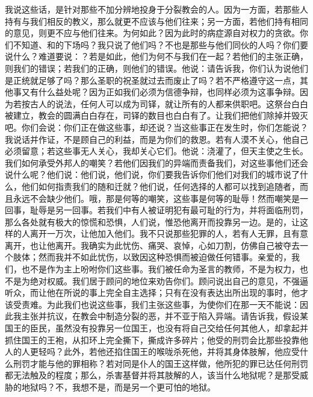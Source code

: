 我说这些话，是针对那些不加分辨地投身于分裂教会的人。因为一方面，若那些人持有与我们相反的教义，那么就更不应该与他们往来；另一方面，若他们持有相同的意见，则更不应与他们往来。为何如此？因为此时的病症源自对权力的贪欲。你们不知道、和的下场吗？我只说了他们吗？不也是那些与他们同伙的人吗？你们要说什么？难道要说：？若是如此，他们为何不与我们在一起？若他们的主张正确，则我们的错误；若我们的正确，则他们的错误。他说：请告诉我，你们认为说他们是正统就足够了吗？那么圣职的祝圣就过去而废止了吗？若不严格遵守这一点，其他事又有什么益处呢？因为正如我们必须为信德争辩，也同样必须为这事争辩。因为若按古人的说法，任何人可以成为司铎，就让所有的人都来供职吧。这祭台白白被建立，教会的圆满白白存在，司铎的数目也白白有了。让我们把他们除掉并毁灭吧。你们会说：你们正在做这些事，却还说？当这些事正在发生时，你们怎能说？我说话并作证，不是顾自己的利益，而是为你们的救恩。若有人漠不关心，他自己必须留意；若这些事无人关心，我却关心它们。他说：浇灌了，但天主使之生长。我们如何承受外邦人的嘲笑？若他们因我们的异端而责备我们，对这些事他们还会说什么呢？他们说：他们说，他们说，你们要我告诉你们他们对我们的城市说了什么，他们如何指责我们的随和迁就？他们说，任何选择的人都可以找到追随者，而且永远不会缺少他们。哦，那是何等的嘲笑，这些事是何等的耻辱！然而嘲笑是一回事，耻辱是另一回事。若我们中有人被证明犯有最可耻的行为，并将面临刑罚，那么各处就有极大的惊慌和恐惧，人们说，惟恐他离开而投靠另一边。是的，让这样的人离开一万次，让他加入他们。我不只说那些犯罪的人，若有人无罪，且有意离开，也让他离开。我确实为此忧伤、痛哭、哀悼，心如刀割，仿佛自己被夺去一个肢体；然而我并不如此忧伤，以致因这种恐惧而被迫做任何错事。亲爱的，我们，也不是作为主上吩咐你们这些事。我们被任命为圣言的教师，不是为权力，也不是为绝对权威。我们居于顾问的地位来劝告你们。顾问说出自己的意见，不强逼听众，而让他在所说的事上完全自主选择；只有在没有表达出所出现的事时，他才该受责难。为此我们也说这些事，我们主张这些事，为使你们在那一天不能说：因此我主张并抗议，在教会中制造分裂的恶，并不亚于陷入异端。请告诉我，假设某国王的臣民，虽然没有投靠另一位国王，也没有将自己交给任何其他人，却拿起并抓住国王的王袍，从扣环上完全撕下，撕成许多碎片；他受的刑罚会比那些投靠他人的人更轻吗？此外，若他还掐住国王的喉咙杀死他，并将其身体肢解，他应受什么刑罚才能与他的罪相称？若对同是仆人的国王这样做，他所犯的罪已达任何刑罚都无法触及的程度；那么，杀害基督并将其肢解的人，该当什么地狱呢？是那受威胁的地狱吗？不，我想不是，而是另一个更可怕的地狱。\par

